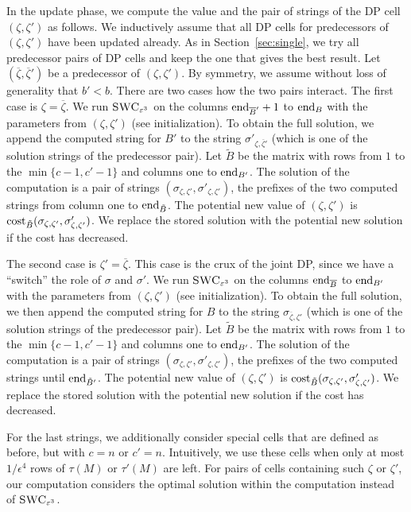 In the update phase, we compute the value and the pair of strings of the DP cell $(\zeta,\zeta')$ as follows. 
We inductively assume that all DP cells for predecessors of $(\zeta,\zeta')$ have been updated already.
As in Section~\ref{sec:single}, we try all predecessor pairs of DP cells and keep the one that gives the best result.
Let $(\overline{\zeta},\overline{\zeta}')$ be a predecessor of $(\zeta,\zeta')$.
By symmetry, we assume without loss of generality that $b' < b$. 
There are two cases how the two pairs interact.
The first case is $\zeta = \overline{\zeta}$.
We run $\textsc{SWC}_{\varepsilon^3}$ on the columns $\textrm{end}_{\overline{B}'}+1$ to $\textrm{end}_{B}$ with the parameters from $(\zeta,\zeta')$ (see initialization).
To obtain the full solution, we append the computed string for $B'$ to the string $\sigma'_{\zeta,\overline{\zeta}'}$ (which is one of the solution strings of the predecessor pair).
Let $\tilde{B}$ be the matrix with rows from $1$ to the $\min\{c - 1,c' - 1\}$ and columns one to $\textrm{end}_{B'}$.
The solution of the computation is a pair of strings $(\sigma_{\zeta,\zeta'},\sigma'_{\zeta,\zeta'})$, the prefixes of the two computed strings from column one to $\textrm{end}_{\tilde{B}}$.
The potential new value of $(\zeta,\zeta')$ is $\mathrm{cost}_{\tilde{B}}(\sigma_{\zeta,\zeta'},\sigma'_{\zeta,\zeta'})$.
We replace the stored solution with the potential new solution if the cost has decreased.

The second case is $\zeta' = \overline{\zeta}$.
This case is the crux of the joint DP, since we have a ``switch'' the role of $\sigma$ and $\sigma'$.
%
We run $\textsc{SWC}_{\varepsilon^3}$ on the columns $\textrm{end}_{\overline{B}}$ to $\textrm{end}_{B'}$ with the parameters from $(\zeta,\zeta')$ (see initialization).
To obtain the full solution, we then append the computed string for $B$ to the string $\sigma_{\overline{\zeta},\zeta'}$ (which is one of the solution strings of the predecessor pair).
Let $\tilde{B}$ be the matrix with rows from $1$ to the $\min\{c - 1,c' - 1\}$ and columns one to $\textrm{end}_{B'}$.
The solution of the computation is a pair of strings $(\sigma_{\zeta,\zeta'},\sigma'_{\zeta,\zeta'})$, the prefixes of the two computed strings until $\textrm{end}_{\tilde{B}'}$.
The potential new value of $(\zeta,\zeta')$ is $\mathrm{cost}_{\tilde{B}}(\sigma_{\zeta,\zeta'},\sigma'_{\zeta,\zeta'})$.
We replace the stored solution with the potential new solution if the cost has decreased.

For the last strings,
we additionally consider special cells that are defined as before, but with $c=n$ or $c'=n$. 
Intuitively, we use these cells when only at most $1/\epsilon^4$ rows of $\tau(M)$ or $\tau'(M)$ are left.
For pairs of cells containing such $\zeta$ or $\zeta'$, our computation considers the optimal solution within the computation instead of $\textsc{SWC}_{\varepsilon^3}$.

